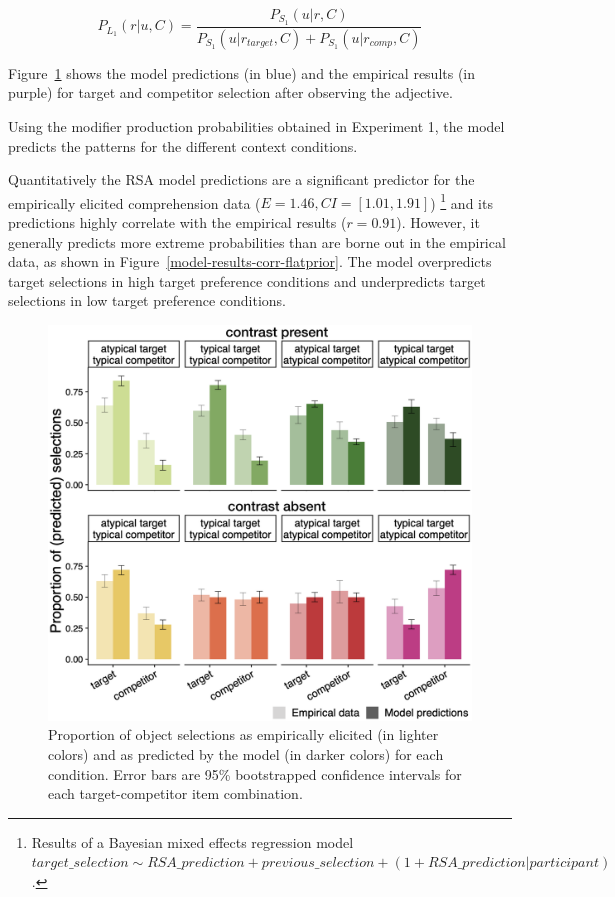 \documentclass[10pt,letterpaper]{article}
\begin{document}
\begin{equation}
	P_{L_1}(r|u,C) = \frac{P_{S_1}(u|r,C)}{P_{S_1}(u|r_{target},C) + P_{S_1}(u|r_{comp},C)}
\label{eq-flatprior}
\end{equation}

Figure~\ref{model-results-flatprior} shows the model predictions (in blue) and the empirical results (in purple) for target and competitor selection after observing the adjective. 

Using the modifier production probabilities obtained in Experiment 1, the model predicts the patterns for the different context conditions. 

Quantitatively the RSA model predictions are a significant predictor for the empirically elicited comprehension data ($E=1.46, CI=[1.01, 1.91]$)
\footnote{Results of a Bayesian mixed effects regression model $target\_selection \sim RSA\_prediction + previous\_selection + (1+RSA\_prediction|participant)$.} 
and its predictions highly correlate with the empirical results ($r=0.91$). However, it generally predicts more extreme probabilities than are borne out in the empirical data, as shown in Figure~\ref{model-results-corr-flatprior}. The model overpredicts target selections in high target preference conditions and underpredicts target selections in low target preference conditions. 

\begin{figure}
	\begin{center}
		\includegraphics[width=.475\textwidth]{graphs/model-bycond-paper.pdf}
	\end{center}
\caption{Proportion of object selections as empirically elicited (in lighter colors) and as predicted by the model (in darker colors) for each condition. Error bars are 95\% bootstrapped confidence intervals for each target-competitor item combination.} 
\label{model-results-flatprior}
\end{figure}
\end{document}
